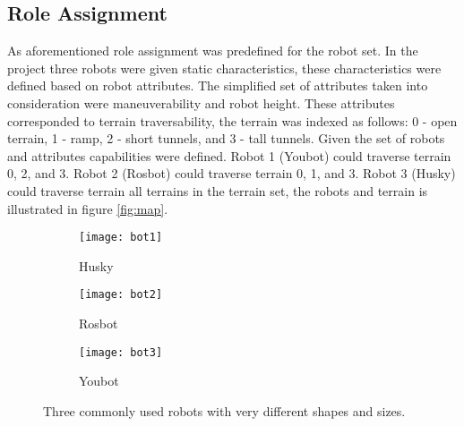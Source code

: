 \subsection{Role Assignment}
As aforementioned role assignment was predefined for the robot set. In the project three robots were given static characteristics, these characteristics were defined based on robot attributes. The simplified set of attributes taken into consideration were maneuverability and robot height. These attributes corresponded to terrain traversability, the terrain was indexed as follows: 0 - open terrain, 1 - ramp, 2 - short tunnels, and 3 - tall tunnels. Given the set of robots and attributes capabilities were defined. Robot 1 (Youbot) could traverse terrain 0, 2, and 3. Robot 2 (Rosbot) could traverse terrain 0, 1, and 3. Robot 3 (Husky) could traverse terrain all terrains in the terrain set, the robots and terrain is illustrated in figure \ref{fig:map}.


\begin{figure}
    \centering
    \begin{subfigure}[b]{0.15\textwidth}
        \texttt{[image: bot1]}
        \caption{Husky}
        \label{fig:bot1}
    \end{subfigure}
    \begin{subfigure}[b]{0.15\textwidth}
        \texttt{[image: bot2]}
        \caption{Rosbot}
        \label{fig:bot2}
    \end{subfigure}
    \begin{subfigure}[b]{0.15\textwidth}
        \texttt{[image: bot3]}
        \caption{Youbot}
        \label{fig:bot3}
    \end{subfigure}
    \caption{Three commonly used robots with very different shapes and sizes.}
    \label{fig:bots}
\end{figure}

